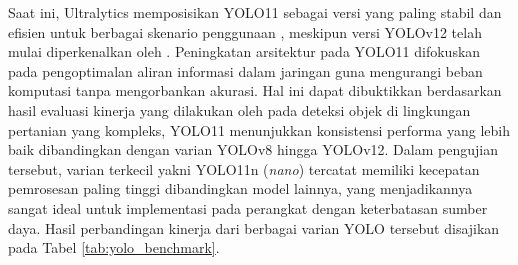 Saat ini, Ultralytics memposisikan YOLO11 sebagai versi yang paling stabil dan efisien untuk berbagai skenario penggunaan \parencite{jocherUltralyticsYOLO2023}, meskipun versi YOLOv12 telah mulai diperkenalkan oleh \textcite{tianYOLOv12AttentionCentricRealTime2025}. Peningkatan arsitektur pada YOLO11 difokuskan pada pengoptimalan aliran informasi dalam jaringan guna mengurangi beban komputasi tanpa mengorbankan akurasi. Hal ini dapat dibuktikkan berdasarkan hasil evaluasi kinerja yang dilakukan oleh \textcite{sapkotaComprehensivePerformanceEvaluation2026} pada deteksi objek di lingkungan pertanian yang kompleks, YOLO11 menunjukkan konsistensi performa yang lebih baik dibandingkan dengan varian YOLOv8 hingga YOLOv12. Dalam pengujian tersebut, varian terkecil yakni YOLO11n (\textit{nano}) tercatat memiliki kecepatan pemrosesan paling tinggi dibandingkan model lainnya, yang menjadikannya sangat ideal untuk implementasi pada perangkat dengan keterbatasan sumber daya. Hasil perbandingan kinerja dari berbagai varian YOLO tersebut disajikan pada Tabel \ref{tab:yolo_benchmark}.


